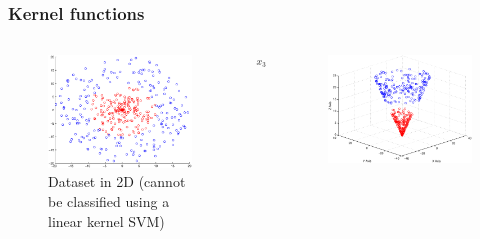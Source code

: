 \documentclass{beamer}
\begin{document}
    \begin{frame}
        \frametitle{Kernel functions}
        \begin{columns}
            \begin{column}{0.4\textwidth}
                \begin{figure}
                    \centering
                    \includegraphics[width=\textwidth]{figures/svm_non_linear_data.eps}
                    \caption{Dataset in 2D (cannot be classified using a linear kernel SVM)}
                \end{figure}
            \end{column}
            \begin{column}{0.2\textwidth}
                \begin{center}
                    $\xrightarrow{x_3 = \sqrt{x_1^2 + x_2^2}}$
                \end{center}
            \end{column}
            \begin{column}{0.4\textwidth}
                \begin{figure}
                    \centering
                    \includegraphics[width=\textwidth]{figures/svm_non_linear_data_3d.eps}

\end{figure}
\end{column}
\end{columns}
\end{frame}
\end{document}
